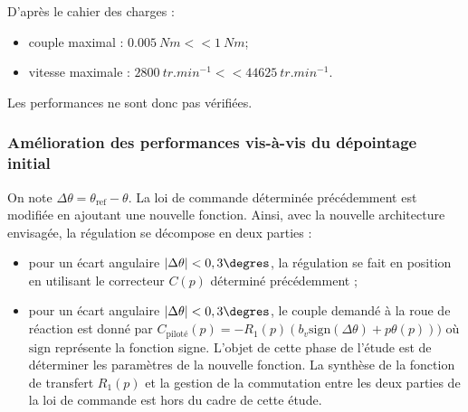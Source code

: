 \ifprof
\begin{corrige}
D'après le cahier des charges : 
\begin{itemize}
\item couple maximal : $\SI{0,005}{Nm} << \SI{1}{Nm}$;
\item vitesse maximale : $\SI{2800}{tr.min^{-1}} << \SI{44625}{tr.min^{-1}}$.
\end{itemize}

Les performances ne sont donc pas vérifiées.

\end{corrige}
\else
\fi

\subsubsection{\label{sec:3:D:2} Amélioration des performances vis-à-vis du dépointage initial}

\ifprof
\else

On note $\Delta \theta = \theta_{\text{ref}}-\theta$. La loi de commande déterminée précédemment est modifiée en ajoutant une nouvelle
fonction. Ainsi, avec la nouvelle architecture envisagée, la régulation se décompose en deux parties :
\begin{itemize}
\item pour un écart angulaire $|\Delta \theta|<0,3\degres$, la régulation se fait en position en utilisant le correcteur $C(p)$ déterminé
précédemment ;
\item pour un écart angulaire $|\Delta \theta|<0,3\degres$, le couple demandé à la roue de réaction est donné par $C_{\text{piloté}}(p)= -R_1(p)\left( b_v \text{sign}(\Delta \theta) + p\theta(p)\right))$ où $\text{sign}$ représente la fonction signe. L’objet de cette phase de l’étude est de
déterminer les paramètres de la nouvelle fonction. La synthèse de la fonction de transfert $R_1(p)$ et la gestion
de la commutation entre les deux parties de la loi de commande est hors du cadre de cette étude.
\end{itemize}
\fi


\ifprof
\begin{corrige}
\end{corrige}
\else
\fi

